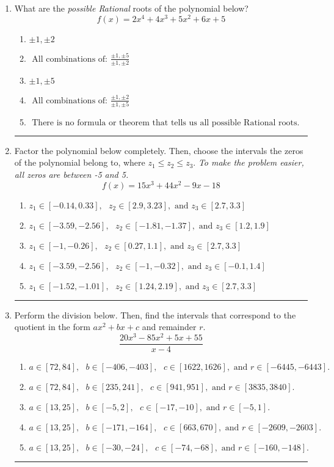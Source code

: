 \documentclass[14pt]{extbook}
\newcommand{\litem}[1]{\item#1\hspace*{-1cm}\rule{\textwidth}{0.4pt}}
\begin{document}
\begin{enumerate}
{\begin{enumerate}[label=\Alph*.]
\end{enumerate} }
\litem{
What are the \textit{possible Rational} roots of the polynomial below?\[ f(x) = 2x^{4} +4 x^{3} +5 x^{2} +6 x + 5 \]\begin{enumerate}[label=\Alph*.]
\item \( \pm 1,\pm 2 \)
\item \( \text{ All combinations of: }\frac{\pm 1,\pm 5}{\pm 1,\pm 2} \)
\item \( \pm 1,\pm 5 \)
\item \( \text{ All combinations of: }\frac{\pm 1,\pm 2}{\pm 1,\pm 5} \)
\item \( \text{ There is no formula or theorem that tells us all possible Rational roots.} \)

\end{enumerate} }
\litem{
Factor the polynomial below completely. Then, choose the intervals the zeros of the polynomial belong to, where $z_1 \leq z_2 \leq z_3$. \textit{To make the problem easier, all zeros are between -5 and 5.}\[ f(x) = 15x^{3} +44 x^{2} -9 x -18 \]\begin{enumerate}[label=\Alph*.]
\item \( z_1 \in [-0.14, 0.33], \text{   }  z_2 \in [2.9, 3.23], \text{   and   } z_3 \in [2.7, 3.3] \)
\item \( z_1 \in [-3.59, -2.56], \text{   }  z_2 \in [-1.81, -1.37], \text{   and   } z_3 \in [1.2, 1.9] \)
\item \( z_1 \in [-1, -0.26], \text{   }  z_2 \in [0.27, 1.1], \text{   and   } z_3 \in [2.7, 3.3] \)
\item \( z_1 \in [-3.59, -2.56], \text{   }  z_2 \in [-1, -0.32], \text{   and   } z_3 \in [-0.1, 1.4] \)
\item \( z_1 \in [-1.52, -1.01], \text{   }  z_2 \in [1.24, 2.19], \text{   and   } z_3 \in [2.7, 3.3] \)

\end{enumerate} }
\litem{
Perform the division below. Then, find the intervals that correspond to the quotient in the form $ax^2+bx+c$ and remainder $r$.\[ \frac{20x^{3} -85 x^{2} +5 x + 55}{x -4} \]\begin{enumerate}[label=\Alph*.]
\item \( a \in [72, 84], \text{   } b \in [-406, -403], \text{   } c \in [1622, 1626], \text{   and   } r \in [-6445, -6443]. \)
\item \( a \in [72, 84], \text{   } b \in [235, 241], \text{   } c \in [941, 951], \text{   and   } r \in [3835, 3840]. \)
\item \( a \in [13, 25], \text{   } b \in [-5, 2], \text{   } c \in [-17, -10], \text{   and   } r \in [-5, 1]. \)
\item \( a \in [13, 25], \text{   } b \in [-171, -164], \text{   } c \in [663, 670], \text{   and   } r \in [-2609, -2603]. \)
\item \( a \in [13, 25], \text{   } b \in [-30, -24], \text{   } c \in [-74, -68], \text{   and   } r \in [-160, -148]. \)


\end{enumerate}}
\end{enumerate}
\end{document}
